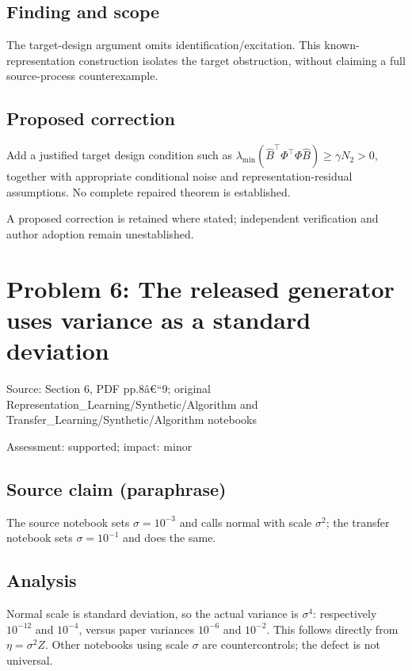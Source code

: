 \documentclass[11pt]{article}
\begin{document}
\subsection*{Finding and scope}

The target-design argument omits identification/excitation. This known-representation construction isolates the target obstruction, without claiming a full source-process counterexample.

\subsection*{Proposed correction}

Add a justified target design condition such as \(\lambda_{\min}(\widehat B^\top\Phi^\top\Phi\widehat B)\ge\gamma N_2>0\), together with appropriate conditional noise and representation-residual assumptions. No complete repaired theorem is established.

A proposed correction is retained where stated; independent verification and author adoption remain unestablished.

\section*{Problem 6: The released generator uses variance as a standard deviation}

Source: Section 6, PDF pp.8â€“9; original Representation\_Learning/Synthetic/Algorithm and Transfer\_Learning/Synthetic/Algorithm notebooks

Assessment: supported; impact: minor

\subsection*{Source claim (paraphrase)}

The source notebook sets \(\sigma=10^{-3}\) and calls normal with scale \(\sigma^2\); the transfer notebook sets \(\sigma=10^{-1}\) and does the same.

\subsection*{Analysis}

Normal scale is standard deviation, so the actual variance is \(\sigma^4\): respectively \(10^{-12}\) and \(10^{-4}\), versus paper variances \(10^{-6}\) and \(10^{-2}\). This follows directly from \(\eta=\sigma^2Z\). Other notebooks using scale \(\sigma\) are countercontrols; the defect is not universal.
\end{document}

